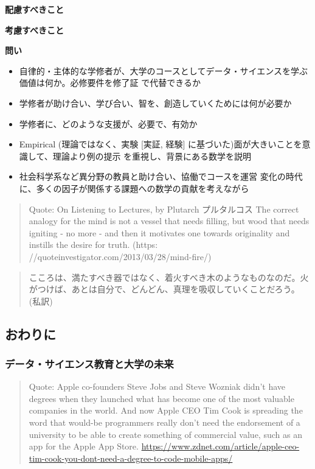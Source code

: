\documentclass[
]{book}
\providecommand{\tightlist}{%
  \setlength{\itemsep}{0pt}\setlength{\parskip}{0pt}}
\theoremstyle{definition}
\theoremstyle{definition}
\theoremstyle{definition}
\theoremstyle{definition}
\theoremstyle{remark}
\begin{document}
\textbf{配慮すべきこと}

\textbf{考慮すべきこと}

\textbf{問い}

\begin{itemize}
\tightlist
\item
  自律的・主体的な学修者が、大学のコースとしてデータ・サイエンスを学ぶ価値は何か。必修要件を修了証 で代替できるか
\item
  学修者が助け合い、学び合い、智を、創造していくためには何が必要か
\item
  学修者に、どのような支援が、必要で、有効か
\item
  Empirical (理論ではなく、実験 {[}実証, 経験{]} に基づいた)面が大きいことを意識して、理論より例の提示 を重視し、背景にある数学を説明
\item
  社会科学系など異分野の教員と助け合い、協働でコースを運営 変化の時代に、多くの因子が関係する課題への数学の貢献を考えながら
\end{itemize}

\begin{quote}
Quote: On Listening to Lectures, by Plutarch プルタルコス The correct analogy for the mind is not a vessel that needs filling, but wood that needs igniting - no more - and then it motivates one towards originality and instills the desire for truth. (https: //quoteinvestigator.com/2013/03/28/mind-fire/)
\end{quote}

\begin{quote}
こころは、満たすべき器ではなく、着火すべき木のようなものなのだ。火がつけば、あとは自分で、どんどん、真理を吸収していくことだろう。(私訳)
\end{quote}

\hypertarget{ux304aux308fux308aux306b}{%
\subsection{おわりに}\label{ux304aux308fux308aux306b}}

\hypertarget{ux30c7ux30fcux30bfux30b5ux30a4ux30a8ux30f3ux30b9ux6559ux80b2ux3068ux5927ux5b66ux306eux672aux6765}{%
\subsubsection{データ・サイエンス教育と大学の未来}\label{ux30c7ux30fcux30bfux30b5ux30a4ux30a8ux30f3ux30b9ux6559ux80b2ux3068ux5927ux5b66ux306eux672aux6765}}

\begin{quote}
Quote: Apple co-founders Steve Jobs and Steve Wozniak didn't have degrees when they launched what has become one of the most valuable companies in the world.
And now Apple CEO Tim Cook is spreading the word that would-be programmers really don't need the endorsement of a university to be able to create something of commercial value, such as an app for the Apple App Store.
\url{https://www.zdnet.com/article/apple-ceo-tim-cook-you-dont-need-a-degree-to-code-mobile-apps/}
\end{quote}
\end{document}
